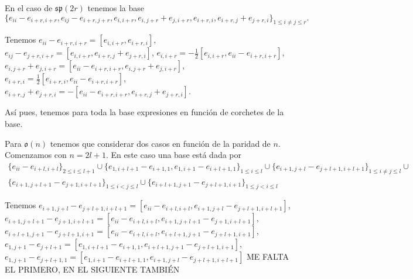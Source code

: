 \documentclass[twoside]{article}
\begin{document}
\begin{solucion}
\begin{enumerate}
%
%

En el caso de $\mathfrak{sp}(2r)$ tenemos la base $$\{e_{ii}-e_{i+r,i+r}, e_{ij}-e_{i+r,j+r},e_{i,i+r}, e_{i,j+r}+e_{j,i+r}, e_{i+r,i}, e_{i+r,j}+e_{j+r,i}\}_{1\leq i\neq j\leq r}.$$ 

Tenemos $e_{ii}-e_{i+r,i+r}=[e_{i,i+r},e_{i+r,i}]$, $e_{ij}-e_{j+r,i+r}=[e_{i,i+r},e_{i+r,j}+e_{j+r,i}]$, $e_{i,i+r}=-\frac{1}{2}[e_{i,i+r},e_{ii}-e_{i+r,i+r}]$, $e_{i,j+r}+e_{j,i+r}=[e_{ii}-e_{i+r,i+r},e_{i,j+r}+e_{j,i+r}]$, $e_{i+r,i}=\frac{1}{2}[e_{i+r,i},e_{ii}-e_{i+r,i+r}]$, $e_{i+r,j}+e_{j+r,i}=-[e_{ii}-e_{i+r,i+r},e_{i+r,j}+e_{j+r,i}]$. 

Así pues, tenemos para toda la base expresiones en función de corchetes de la base. 




Para $\mathfrak{o}(n)$ tenemos que considerar dos casos en función de la paridad de $n$. Comenzamos con $n=2l+1$. En este caso una base está dada por 
\begin{gather*}
\{e_{ii}-e_{i+l,i+l}\}_{2\leq i\leq l+1}\cup \{e_{1,i+l+1}-e_{i+1,1}, e_{1,i+1}-e_{i+l+1,1}\}_{1\leq i\leq l}\cup\{e_{i+1,j+l}-e_{j+l+1,i+l+1}\}_{1\leq i\neq j\leq l}\cup\\
\{e_{i+1,j+l+1}-e_{j+1,i+l+1}\}_{1\leq i<j\leq l}\cup \{e_{i+l+1,j+1}-e_{j+l+1,i+1}\}_{1\leq j<i\leq l}
\end{gather*}

Tenemos $e_{i+1,j+l}-e_{j+l+1,i+l+1}=[e_{ii}-e_{i+l,i+l},e_{i+1,j+l}-e_{j+l+1,i+l+1}]$, $e_{i+1,j+l+1}-e_{j+1,i+l+1}=[e_{ii}-e_{i+l,i+l},e_{i+1,j+l+1}-e_{j+1,i+l+1}]$, $e_{i+l+1,j+1}-e_{j+l+1,i+1}=[e_{ii}-e_{i+l,i+l},e_{i+l+1,j+1}-e_{j+l+1,i+1}]$, $e_{1,j+1}-e_{j+l+1}=[e_{1,i+l+1}-e_{i+1,1},e_{i+l+1,j+1}-e_{j+l+1,i+1}]$, $e_{1,j+1}-e_{j+l+1,1}=[e_{1,i+1}-e_{i+l+1,1},e_{i+1,j+l}-e_{j+l+1,i+l+1}]$ ME FALTA EL PRIMERO, EN EL SIGUIENTE TAMBIÉN


\end{enumerate}
\end{solucion}
\end{document}
